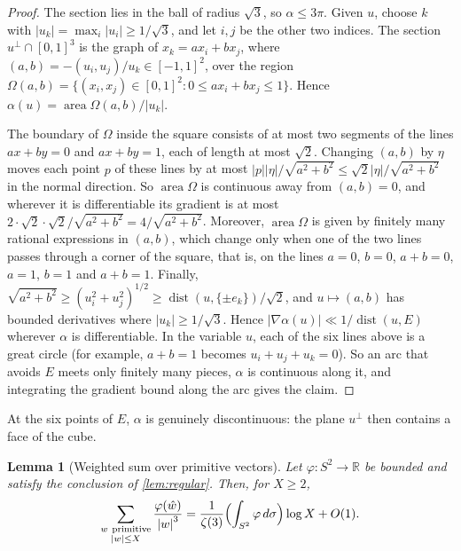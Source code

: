 \documentclass[11pt]{article}
\newtheorem{lemma}[theorem]{Lemma}
\theoremstyle{definition}
\newcommand{\R}{\mathbb{R}}
\newcommand{\abs}[1]{\left\lvert #1 \right\rvert}
\begin{document}
\begin{proof}
The section lies in the ball of radius $\sqrt3$, so $\alpha\le3\pi$. Given $u$, choose $k$ with $\abs{u_k}=\max_i\abs{u_i}\ge1/\sqrt3$, and let $i,j$ be the other two indices. The section $u^\perp\cap[0,1]^3$ is the graph of $x_k=ax_i+bx_j$, where $(a,b)=-(u_i,u_j)/u_k\in[-1,1]^2$, over the region $\Omega(a,b)=\{(x_i,x_j)\in[0,1]^2:0\le ax_i+bx_j\le1\}$. Hence $\alpha(u)=\operatorname{area}\Omega(a,b)/\abs{u_k}$.

The boundary of $\Omega$ inside the square consists of at most two segments of the lines $ax+by=0$ and $ax+by=1$, each of length at most $\sqrt2$. Changing $(a,b)$ by $\eta$ moves each point $p$ of these lines by at most $\abs{p}\abs{\eta}/\sqrt{a^2+b^2}\le\sqrt2\abs\eta/\sqrt{a^2+b^2}$ in the normal direction. So $\operatorname{area}\Omega$ is continuous away from $(a,b)=0$, and wherever it is differentiable its gradient is at most $2\cdot\sqrt2\cdot\sqrt2/\sqrt{a^2+b^2}=4/\sqrt{a^2+b^2}$. Moreover, $\operatorname{area}\Omega$ is given by finitely many rational expressions in $(a,b)$, which change only when one of the two lines passes through a corner of the square, that is, on the lines $a=0$, $b=0$, $a+b=0$, $a=1$, $b=1$ and $a+b=1$. Finally, $\sqrt{a^2+b^2}\ge(u_i^2+u_j^2)^{1/2}\ge\operatorname{dist}(u,\{\pm e_k\})/\sqrt2$, and $u\mapsto(a,b)$ has bounded derivatives where $\abs{u_k}\ge1/\sqrt3$. Hence $\abs{\nabla\alpha(u)}\ll1/\operatorname{dist}(u,E)$ wherever $\alpha$ is differentiable. In the variable $u$, each of the six lines above is a great circle (for example, $a+b=1$ becomes $u_i+u_j+u_k=0$). So an arc that avoids $E$ meets only finitely many pieces, $\alpha$ is continuous along it, and integrating the gradient bound along the arc gives the claim.
\end{proof}

At the six points of $E$, $\alpha$ is genuinely discontinuous: the plane $u^\perp$ then contains a face of the cube.

\begin{lemma}[Weighted sum over primitive vectors]\label{lem:weighted}
Let $\varphi:S^2\to\R$ be bounded and satisfy the conclusion of \cref{lem:regular}. Then, for $X\ge2$,
\[
\sum_{\substack{w\ \text{primitive}\\ \abs w\le X}}\frac{\varphi(\hat w)}{\abs w^3}=\frac{1}{\zeta(3)}\Bigl(\int_{S^2}\varphi\,d\sigma\Bigr)\log X+O(1).
\]
\end{lemma}
\end{document}
